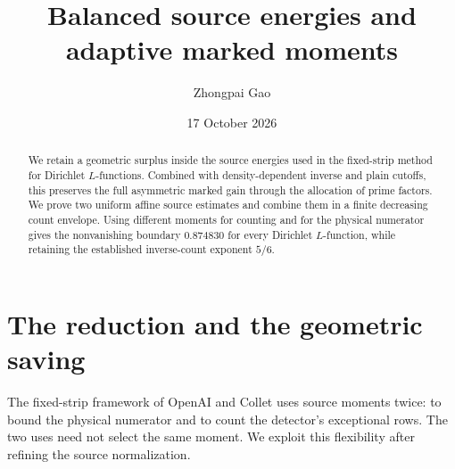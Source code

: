 \documentclass[10pt,a4paper]{article}
\title{Balanced source energies and adaptive marked moments}
\author{Zhongpai Gao}
\date{17 October 2026}
\begin{document}
\maketitle
\vspace{-2em}
\begin{abstract}
We retain a geometric surplus inside the source energies used in the
fixed-strip method for Dirichlet $L$-functions. Combined with
density-dependent inverse and plain cutoffs, this preserves the full
asymmetric marked gain through the allocation of prime factors.
We prove two uniform affine source estimates and combine them in a
finite decreasing count envelope. Using different moments for counting
and for the physical numerator gives the nonvanishing boundary
$0.874830$ for every Dirichlet $L$-function, while retaining the
established inverse-count exponent $5/6$.
\end{abstract}

\section{The reduction and the geometric saving}
The fixed-strip framework of OpenAI and Collet \cite{openai,collet}
uses source moments twice: to bound the physical numerator and to count
the detector's exceptional rows. The two uses need not select the same
moment. We exploit this flexibility after refining the source normalization.
\end{document}
